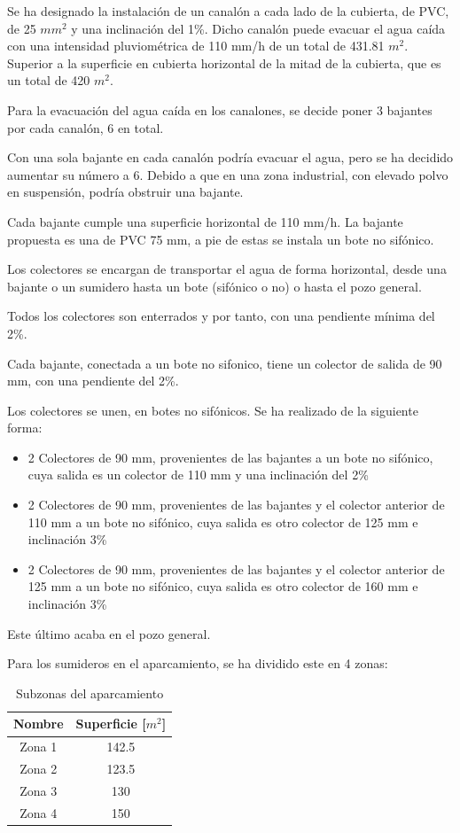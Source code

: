 \documentclass[../main.tex]{subfiles}
\begin{document}
Se ha designado la instalación de un canalón a cada lado de la cubierta, de PVC, de 25 $ mm^2$ y una inclinación del 1\%. Dicho canalón puede evacuar el agua caída con una intensidad pluviométrica de 110 mm/h de un total de 431.81 $ m^2$. Superior a la superficie en cubierta horizontal de la mitad de la cubierta, que es un total de 420 $m^2$.

Para la evacuación del agua caída en los canalones, se decide poner 3 bajantes por cada canalón, 6 en total.

Con una sola bajante en cada canalón podría evacuar el agua, pero se ha decidido aumentar su número a 6. Debido a que en una zona industrial, con elevado polvo en suspensión, podría obstruir una bajante. 

Cada bajante cumple una superficie horizontal de 110 mm/h. La bajante propuesta es una de PVC 75 mm, a pie de estas se instala un bote no sifónico.

Los colectores se encargan de transportar el agua de forma horizontal, desde una bajante o un sumidero hasta un bote (sifónico o no) o hasta el pozo general.

Todos los colectores son enterrados y por tanto, con una pendiente mínima del 2\%.

Cada bajante, conectada a un bote no sifonico, tiene un colector de salida de 90 mm, con una pendiente del 2\%.

Los colectores se unen, en botes no sifónicos. Se ha realizado de la siguiente forma:

\begin{itemize}
    \item 2 Colectores de 90 mm, provenientes de las bajantes a un bote no sifónico, cuya salida es un colector de 110 mm y una inclinación del 2\%
    \item 2 Colectores de 90 mm, provenientes de las bajantes y el colector anterior de 110 mm a un bote no sifónico, cuya salida es otro colector de 125 mm e inclinación 3\%
    \item 2 Colectores de 90 mm, provenientes de las bajantes y el colector anterior de 125 mm a un bote no sifónico, cuya salida es otro colector de 160 mm e inclinación 3\%
\end{itemize}

Este último acaba en el pozo general.

Para los sumideros en el aparcamiento, se ha dividido este en 4 zonas:

\begin{table}[H]
    \centering
    \begin{tabular}{c|c}
         Nombre & Superficie [$m^2$] \\ \hline
         Zona 1 & 142.5 \\
         Zona 2 & 123.5\\
         Zona 3 & 130\\
         Zona 4 & 150\\
    \end{tabular}
    \caption{Subzonas del aparcamiento}
\end{table}
\end{document}
